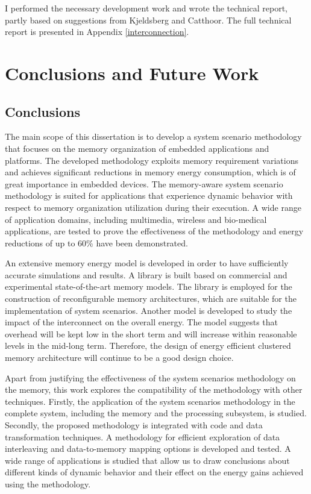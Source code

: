 I performed the necessary development work and wrote the technical report, partly based on suggestions from Kjeldsberg and Catthoor. 
The full technical report is presented in Appendix \ref{interconnection}.

\chapter{Conclusions and Future Work}
\label{conclusions}

\section{Conclusions}

The main scope of this dissertation is to develop a system scenario methodology that focuses on the memory organization of embedded applications and platforms. 
The developed methodology exploits memory requirement variations and achieves significant reductions in memory energy consumption, which is of great importance in embedded devices. 
The memory-aware system scenario methodology is suited for applications that experience dynamic behavior with respect to memory organization utilization during their execution.
A wide range of application domains, including multimedia, wireless and bio-medical applications, are tested to prove the effectiveness of the methodology and energy reductions of up to 60\% have been demonstrated.

An extensive memory energy model is developed in order to have sufficiently accurate simulations and results.
A library is built based on commercial and experimental state-of-the-art memory models.
The library is employed for the construction of reconfigurable memory architectures, which are suitable for the implementation of system scenarios.
Another model is developed to study the impact of the interconnect on the overall energy.
The model suggests that overhead will be kept low in the short term and will increase within reasonable levels in the mid-long term.
Therefore, the design of energy efficient clustered memory architecture will continue to be a good design choice.

Apart from justifying the effectiveness of the system scenarios methodology on the memory, this work explores the compatibility of the methodology with other techniques.
Firstly, the application of the system scenarios methodology in the complete system, including the memory and the processing subsystem, is studied.
Secondly, the proposed methodology is integrated with code and data transformation techniques.
A methodology for efficient exploration of data interleaving and data-to-memory mapping options is developed and tested.
A wide range of applications is studied that allow us to draw conclusions about different kinds of dynamic behavior and their effect on the energy gains achieved using the methodology. 

